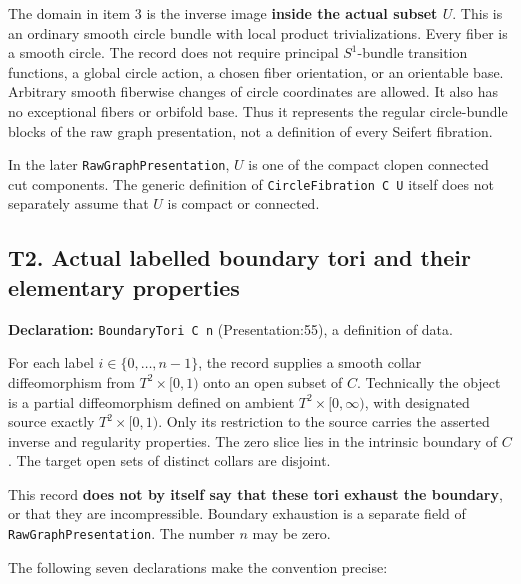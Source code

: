 \documentclass[
  letterpaper,
  11pt]{article}
\begin{document}
The domain in item 3 is the inverse image \textbf{inside the actual
subset \(U\)}. This is an ordinary smooth circle bundle with local
product trivializations. Every fiber is a smooth circle. The record does
not require principal \(S^1\)-bundle transition functions, a global
circle action, a chosen fiber orientation, or an orientable base.
Arbitrary smooth fiberwise changes of circle coordinates are allowed. It
also has no exceptional fibers or orbifold base. Thus it represents the
regular circle-bundle blocks of the raw graph presentation, not a
definition of every Seifert fibration.

In the later
{\small\texttt{Raw\allowbreak{}Graph\allowbreak{}Presentation}}, \(U\)
is one of the compact clopen connected cut components. The generic
definition of {\small\texttt{Circle\allowbreak{}Fibration C U}} itself
does not separately assume that \(U\) is compact or connected.

\subsection{T2. Actual labelled boundary tori and their elementary
properties}\label{t2}

\textbf{Declaration:} {\small\texttt{Boundary\allowbreak{}Tori C n}}
(Presentation:55), a definition of data.

For each label \(i\in\{0,\ldots,n-1\}\), the record supplies a smooth
collar diffeomorphism from \(T^2\times[0,1)\) onto an open subset of
\(C\). Technically the object is a partial diffeomorphism defined on
ambient \(T^2\times[0,\infty)\), with designated source exactly
\(T^2\times[0,1)\). Only its restriction to the source carries the
asserted inverse and regularity properties. The zero slice lies in the
intrinsic boundary of \(C\). The target open sets of distinct collars
are disjoint.

This record \textbf{does not by itself say that these tori exhaust the
boundary}, or that they are incompressible. Boundary exhaustion is a
separate field of
{\small\texttt{Raw\allowbreak{}Graph\allowbreak{}Presentation}}. The
number \(n\) may be zero.

The following seven declarations make the convention precise:
\end{document}
